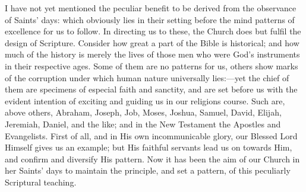 I have not yet mentioned the peculiar benefit to be derived from the
observance of Saints' days: which obviously lies in their setting before
the mind patterns of excellence for us to follow. In directing us to
these, the Church does but fulfil the design of Scripture. Consider how
great a part of the Bible is historical; and how much of the history is
merely the lives of those men who were God's instruments in their
respective ages. Some of them are no patterns for us, others show marks
of the corruption under which human nature universally lies:—yet the
chief of them are specimens of especial faith and sanctity, and are set
before us with the evident intention of exciting and guiding us in our
religions course. Such are, above others, Abraham, Joseph, Job, Moses,
Joshua, Samuel, David, Elijah, Jeremiah, Daniel, and the like; and in
the New Testament the Apostles and Evangelists. First of all, and in His
own incommunicable glory, our Blessed Lord Himself gives us an example;
but His faithful servants lead us on towards Him, and confirm and
diversify His pattern. Now it has been the aim of our Church in her
Saints' days to maintain the principle, and set a pattern, of this
peculiarly Scriptural teaching.

